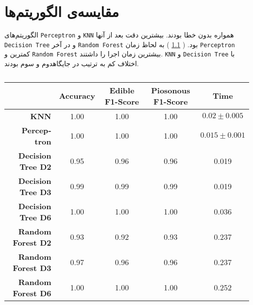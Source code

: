 



\chapter{مقایسه‌ی الگوریتم‌ها}
الگوریتم‌های
\verb;Perceptron;
و
\verb;KNN;
همواره بدون خطا بودند.
بیشترین دقت بعد از آنها
\verb;Decision Tree;
و
در آخر
\verb;Random Forest;
بود.
(
\cref{RESULTS_TAB}
)
به لحاظ زمان
\verb;Perceptron;
کمترین
و
\verb;Random Forest;
بیشترین زمان اجرا را داشتند.
\verb;KNN;
و
\verb;Decision Tree;
با اختلاف کم به ترتیب در جایگاهدوم و سوم بودند.


\begin{latin}
\begin{table}[h!]
  \begin{center}
    \caption{}
    \label{RESULTS_TAB}
    \begin{tabular}{r|c|c|c|c} %
  & \textbf{Accuracy}  & \textbf{Edible F1-Score} & \textbf{Piosonous F1-Score} & \textbf{Time} \\
      \hline
      \textbf{KNN} & 1.00 & 1.00 & 1.00 & $0.02 \pm 0.005$ \\
      \textbf{Perceptron} & 1.00 & 1.00 & 1.00 & $0.015 \pm 0.001$ \\
      \textbf{Decision Tree D2} & 0.95 & 0.96 & 0.96 & 0.019 \\
      \textbf{Decision Tree D3} & 0.99 & 0.99 & 0.99 & 0.019 \\
      \textbf{Decision Tree D6} & 1.00 & 1.00 & 1.00 & 0.036 \\
      \textbf{Random Forest D2} & 0.93 & 0.92 & 0.93 & 0.237 \\
      \textbf{Random Forest D3} & 0.97 & 0.96 & 0.96 & 0.237 \\
      \textbf{Random Forest D6} & 1.00 & 1.00 & 1.00 & 0.252 \\
    \end{tabular}
  \end{center}
\end{table}
\end{latin}
